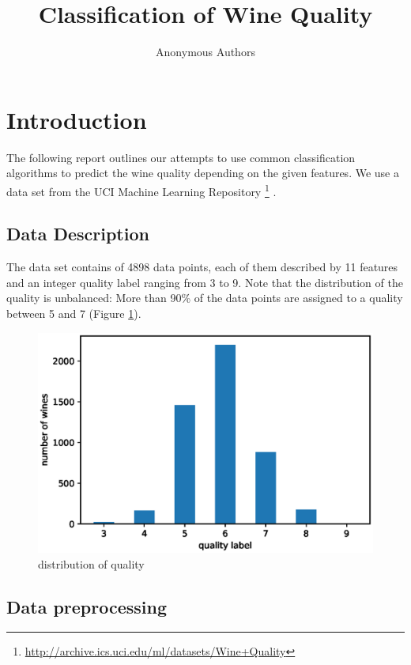 \documentclass[twocolumn]{scrartcl}
\title{Classification of Wine Quality}
\author{Anonymous Authors}
\begin{document}
\maketitle

\section{Introduction}

The following report outlines our attempts to use common classification
algorithms to predict the wine quality depending on the given features.
We use a data set from the UCI Machine Learning Repository
\footnote{\url{http://archive.ics.uci.edu/ml/datasets/Wine+Quality}} \parencite{data}.

\subsection{Data Description}

The data set contains of 4898 data points, each of them described by 11 features
and an integer quality label ranging from 3 to 9.
Note that the distribution of the quality is unbalanced:
More than 90\% of the data points are assigned to a quality between 5 and 7 (Figure \ref{fig:unbal}).

\begin{figure}[h]
    \centering
    \includegraphics[width=\linewidth]{images/unbalanced.eps}
    \caption{distribution of quality}
    \label{fig:unbal}
\end{figure}

\subsection{Data preprocessing}
\end{document}
